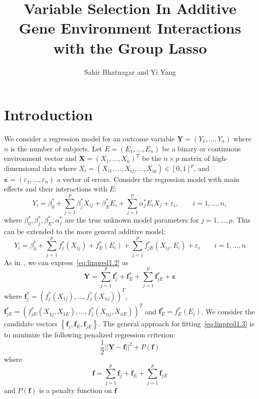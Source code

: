 \documentclass[12pt,letter]{article}
\title{Variable Selection In Additive Gene Environment Interactions with the Group Lasso}
\author{Sahir Bhatnagar and Yi Yang}
\newcommand {\bs}{\boldsymbol}
\newcommand{\mb}[1]{\mathbf{#1}}
\newcommand{\bx}{\mathbf{X}}
\begin{document}
\newpage
\pagestyle{fancy}

\maketitle
\section{Introduction}



We consider a regression model for an outcome variable $\mathbf{Y}=(Y_1, \ldots, Y_n)$ where $n$ is the number of subjects. 
Let $E=(E_1, \ldots, E_n)$ be a binary or continuous environment vector and \mbox{$\bx = (X_{1}, \ldots, X_{n})^T$} be the $n \times p$ matrix of high-dimensional data where $X_i = (X_{i1}, \ldots,X_{ij}, \ldots,  X_{ip}) \in [0,1]^p$, and $\bs{\varepsilon} = (\varepsilon_1, \ldots, \varepsilon_n)$ a vector of errors. 
Consider the regression model with main effects and their interactions with $E$:
\begin{equation}  
Y_i = \beta^*_0 + \sum_{j=1}^p \beta^*_j X_{ij} + \beta^*_E E_i + \sum_{j=1}^p \alpha^*_j E_i X_j + \varepsilon_i, \qquad i=1, \ldots, n \label{eq:linpred1.1},
\end{equation}
where $\beta^*_0,\beta^*_j,\beta^*_E,\alpha^*_j$ are the true unknown model parameters for $j=1, \ldots, p$. 
This can be extended to the more general additive model:
\begin{equation}  
Y_i = \beta^*_0 + \sum_{j=1}^p f^*_j (X_{ij}) + f_E^*(E_i) + \sum_{j=1}^p f^*_{jE} (X_{ij},E_i) + \varepsilon_i \qquad i=1, \ldots, n \label{eq:linpred1.2}
\end{equation}
As in~\citep{radchenko2010variable}, we can express~\eqref{eq:linpred1.2} as 
\begin{equation}
\mb{Y} =  \sum_{j=1}^p \mb{f}^*_j + \mb{f}_E^* + \sum_{j=1}^p \mb{f}^*_{jE} + \bs{\varepsilon} \label{eq:linpred1.3}
\end{equation}
where $\mb{f}^*_j = \left(f_j^*(X_{1j}), \ldots, f_j^*(X_{nj})\right)^T$, $\mb{f}^*_{jE} = \left(f_{jE}^*(X_{1j},X_{1E}), \ldots, f_j^*(X_{nj}, X_{nE})\right)^T$ and \mbox{$\mb{f}_E^* = f_E^*(E_i)$}. 
We consider the candidate vectors $\left\lbrace \mb{f}_j,\mb{f}_E, \mb{f}_{jE}\right\rbrace$. The general approach for fitting~\eqref{eq:linpred1.3} is to minimize the following penalized regression criterion:
\begin{equation}
\frac{1}{2} \lvert\lvert \mb{Y} - \mb{f} \rvert\rvert^2 + P(\mb{f})
\end{equation}
where 
\begin{equation}
\mb{f} = \sum_{j=1}^p \mb{f}_j + \mb{f}_E + \sum_{j=1}^p \mb{f}_{jE}
\end{equation}
and $P(\mb{f})$ is a penalty function on $\mb{f}$












\newpage
%


\end{document}
